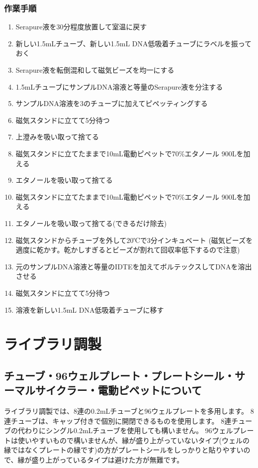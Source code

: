 \documentclass[titlepage,10pt,a4paper,uplatex]{jsbook}
\begin{document}
\subsubsection{作業手順}
\begin{enumerate}
\item Serapure液を30分程度放置して室温に戻す
\item 新しい1.5mLチューブ、新しい1.5mL DNA低吸着チューブにラベルを振っておく
\item Serapure液を転倒混和して磁気ビーズを均一にする
\item 1.5mLチューブにサンプルDNA溶液と等量のSerapure液を分注する
\item サンプルDNA溶液を3のチューブに加えてピペッティングする
\item 磁気スタンドに立てて5分待つ
\item 上澄みを吸い取って捨てる
\item 磁気スタンドに立てたままで10mL電動ピペットで70\%エタノール 900{\textmu}Lを加える
\item エタノールを吸い取って捨てる
\item 磁気スタンドに立てたままで10mL電動ピペットで70\%エタノール 900{\textmu}Lを加える
\item エタノールを吸い取って捨てる(できるだけ除去)
\item 磁気スタンドからチューブを外して20℃で3分インキュベート (磁気ビーズを適度に乾かす。乾かしすぎるとビーズが割れて回収率低下するので注意)
\item 元のサンプルDNA溶液と等量のIDTEを加えてボルテックスしてDNAを溶出させる
\item 磁気スタンドに立てて5分待つ
\item 溶液を新しい1.5mL DNA低吸着チューブに移す
\end{enumerate}

\section{ライブラリ調製}

\subsection{チューブ・96ウェルプレート・プレートシール・サーマルサイクラー・電動ピペットについて}

ライブラリ調製では、8連の0.2mLチューブと96ウェルプレートを多用します。
8連チューブは、キャップ付きで個別に開閉できるものを使用します。
8連チューブの代わりにシングル0.2mLチューブを使用しても構いません。
96ウェルプレートは使いやすいもので構いませんが、縁が盛り上がっていないタイプ(ウェルの縁ではなくプレートの縁です)の方がプレートシールをしっかりと貼りやすいので、縁が盛り上がっているタイプは避けた方が無難です。
\end{document}
